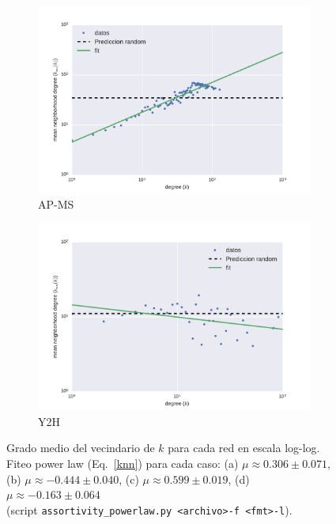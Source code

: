\begin{figure}[!ht]
\begin{subfigure}[b]{0.45\columnwidth}
        \includegraphics[width=\textwidth]{./schemes/assort_yeast_AP-MS-txt_loglog.pdf}
        \caption{\label{fig4:ap_ms} AP-MS}
    \end{subfigure}
    \begin{subfigure}[b]{0.45\columnwidth}
        \includegraphics[width=\textwidth]{./schemes/assort_yeast_Y2H-txt_loglog.pdf}
        \caption{\label{fig4:y2h} Y2H}
    \end{subfigure}
    \caption{\label{fig4:mu} Grado medio del vecindario de $k$ para cada red en escala log-log. 
    Fiteo power law (Eq.~\ref{knn}) para cada caso: 
    (a) $\mu \approx 0.306 \pm 0.071$,
    (b) $\mu \approx -0.444 \pm 0.040$,
    (c) $\mu \approx 0.599 \pm 0.019$,
    (d) $\mu \approx -0.163 \pm 0.064$\\
    (script \texttt{assortivity\_powerlaw.py~<archivo>\quad-f <fmt>\quad-l}).}
\end{figure}



